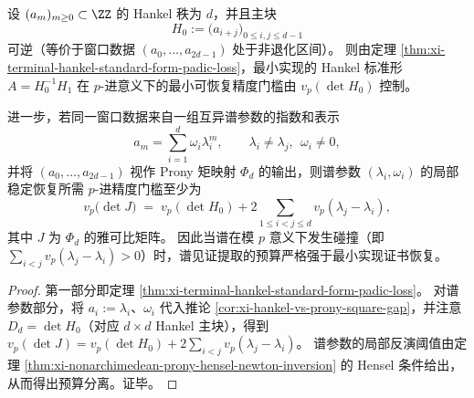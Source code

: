 \begin{corollary}\label{cor:xi-pom-minreal-vs-spectral-budget-separation}
设 \((a_m)_{m\ge 0}\subset\ZZ\) 的 Hankel 秩为 \(d\)，并且主块
\[
H_0:=\bigl(a_{i+j}\bigr)_{0\le i,j\le d-1}
\]
可逆（等价于窗口数据 \((a_0,\dots,a_{2d-1})\) 处于非退化区间）。
则由定理 \ref{thm:xi-terminal-hankel-standard-form-padic-loss}，最小实现的 Hankel 标准形
\(
A=H_0^{-1}H_1
\)
在 \(p\)-进意义下的最小可恢复精度门槛由 \(v_p(\det H_0)\) 控制。
\par
进一步，若同一窗口数据来自一组互异谱参数的指数和表示
\[
a_m=\sum_{i=1}^{d}\omega_i\lambda_i^{m},
\qquad
\lambda_i\neq \lambda_j,\ \ \omega_i\neq 0,
\]
并将 \((a_0,\dots,a_{2d-1})\) 视作 Prony 矩映射 \(\Phi_d\) 的输出，则谱参数 \((\lambda_i,\omega_i)\) 的局部稳定恢复所需 \(p\)-进精度门槛至少为
\[
v_p\!\bigl(\det J\bigr)
\;=\;
v_p(\det H_0)+2\sum_{1\le i<j\le d} v_p(\lambda_j-\lambda_i),
\]
其中 \(J\) 为 \(\Phi_d\) 的雅可比矩阵。
因此当谱在模 \(p\) 意义下发生碰撞（即 \(\sum_{i<j} v_p(\lambda_j-\lambda_i)>0\)）时，谱见证提取的预算严格强于最小实现证书恢复。
\end{corollary}
\begin{proof}
第一部分即定理 \ref{thm:xi-terminal-hankel-standard-form-padic-loss}。
对谱参数部分，将 \(a_i:=\lambda_i\)、\(\omega_i\) 代入推论 \ref{cor:xi-hankel-vs-prony-square-gap}，并注意 \(D_d=\det H_0\)（对应 \(d\times d\) Hankel 主块），得到
\(
v_p(\det J)=v_p(\det H_0)+2\sum_{i<j}v_p(\lambda_j-\lambda_i)
\)。
谱参数的局部反演阈值由定理 \ref{thm:xi-nonarchimedean-prony-hensel-newton-inversion} 的 Hensel 条件给出，从而得出预算分离。证毕。
\end{proof}
